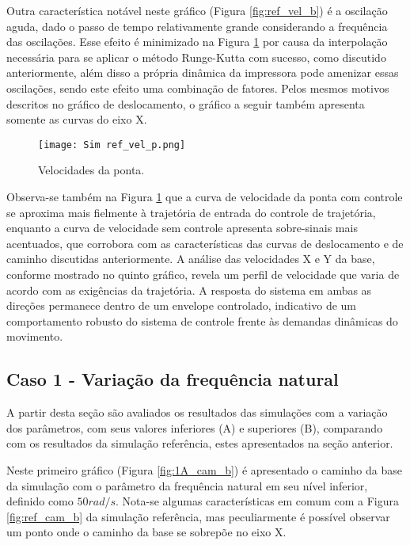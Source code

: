 Outra característica notável neste gráfico (Figura \ref{fig:ref_vel_b}) é a oscilação aguda, dado o passo de tempo relativamente grande considerando a frequência das oscilações. Esse efeito é minimizado na Figura \ref{fig:ref_vel_p} por causa da interpolação necessária para se aplicar o método Runge-Kutta com sucesso, como discutido anteriormente, além disso a própria dinâmica da impressora pode amenizar essas oscilações, sendo este efeito uma combinação de fatores. Pelos mesmos motivos descritos no gráfico de deslocamento, o gráfico a seguir também apresenta somente as curvas do eixo X. 

\begin{figure}[H]
    \centering
    \caption{Velocidades da ponta.}
    \texttt{[image: Sim ref\_vel\_p.png]}

    \label{fig:ref_vel_p}
\end{figure}

Observa-se também na Figura \ref{fig:ref_vel_p} que a curva de velocidade da ponta com controle se aproxima mais fielmente à trajetória de entrada do controle de trajetória, enquanto a curva de velocidade sem controle apresenta sobre-sinais mais acentuados, que corrobora com as características das curvas de deslocamento e de caminho discutidas anteriormente.
A análise das velocidades X e Y da base, conforme mostrado no quinto gráfico, revela um perfil de velocidade que varia de acordo com as exigências da trajetória. A resposta do sistema em ambas as direções permanece dentro de um envelope controlado, indicativo de um comportamento robusto do sistema de controle frente às demandas dinâmicas do movimento.

\subsection{Caso 1 - Variação da frequência natural}
A partir desta seção são avaliados os resultados das simulações com a variação dos parâmetros, com seus valores inferiores (A) e superiores (B), comparando com os resultados da simulação referência, estes apresentados na seção anterior.

Neste primeiro gráfico (Figura \ref{fig:1A_cam_b}) é apresentado o caminho da base da simulação com o parâmetro da frequência natural em seu nível inferior, definido como \(50 rad/s\). Nota-se algumas características em comum com a Figura \ref{fig:ref_cam_b} da simulação referência, mas peculiarmente é possível observar um ponto onde o caminho da base se sobrepõe no eixo X.

